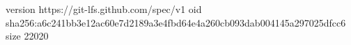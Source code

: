 version https://git-lfs.github.com/spec/v1
oid sha256:a6c241bb3e12ac60e7d2189a3e4fbd64e4a260cb093dab004145a297025dfcc6
size 22020
